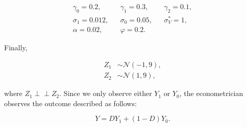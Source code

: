 \documentclass[9pt,twocolumn,twoside,]{pnas-new}
\begin{document}
\begin{align*}
\gamma_0 = 0.2, && \gamma_1 = 0.3, && \gamma_2 = 0.1, \\
\sigma_1 = 0.012, && \sigma_0 = 0.05, && \sigma^*_V = 1, \\
\alpha = 0.02, && \varphi = 0.2.
\end{align*}

Finally,

\begin{align*}
Z_1 &\sim \mathcal{N}(-1, 9), \\
Z_2 &\sim \mathcal{N} (1, 9),
\end{align*}

where \(Z_1 \perp\!\!\!\!\perp Z_2\). Since we only observe either
\(Y_1\) or \(Y_0\), the econometrician observes the outcome described as
follows:

\[
Y = DY_1 + (1 - D)Y_0.
\]

\newpage
\end{document}
